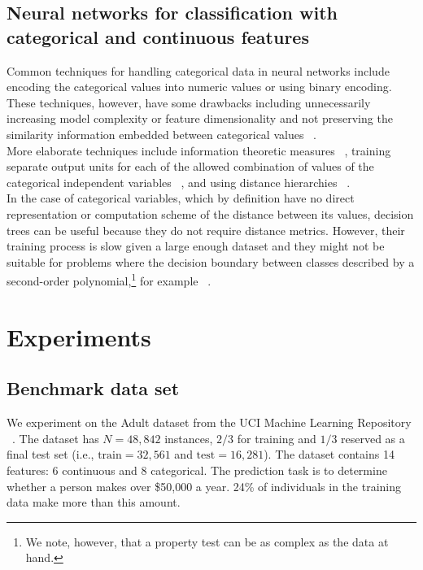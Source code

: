 \documentclass[10pt,twocolumn,letterpaper]{article}
\begin{document}
\subsection{Neural networks for classification with categorical and
continuous features}  Common techniques for handling categorical data in
neural networks include encoding the categorical values into numeric values
or using binary encoding. These techniques, however, have some drawbacks
including unnecessarily increasing model complexity or feature dimensionality
and not preserving the similarity information embedded between categorical
values ~\cite{hsu2006generalizing}.\\

More elaborate techniques include information theoretic measures
~\cite{wang2008categorical}, training separate output units for
each of the allowed combination of values of the categorical independent
variables ~\cite{brouwer2002feed}, and using distance
hierarchies ~\cite{hsu2006generalizing}. \\

In the case of categorical variables, which by definition have no direct
representation or computation scheme of the distance between its values,
decision trees can be useful because they do not require distance metrics.
However, their training process is slow given a large enough dataset and they
might not be suitable for problems where the decision boundary between classes
described by a second-order polynomial,\footnote{We note, however, that a
property test can be as complex as the data at hand.} for
example ~\cite{fayyad1996data}.

\section{Experiments} \label{section:experiments}

\subsection{Benchmark data set}

We experiment on the Adult dataset from the UCI Machine Learning Repository ~\cite{Lichman2013}. The dataset has $N=48,842$ instances, $2/3$ for training and $1/3$ reserved as a final test set (i.e., $\mathrm{train}=32,561$ and $\mathrm{test}=16,281$). The dataset contains 14 features: 6 continuous and 8 categorical. The prediction task is to determine whether a person makes over \$50,000 a year. 24\% of individuals in the training data make more than this amount. \\
\end{document}
